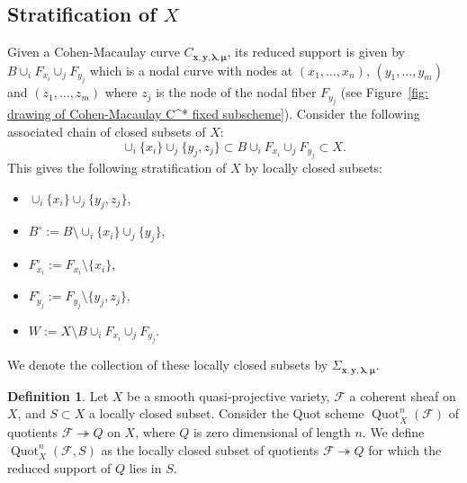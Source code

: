 \documentclass[12pt]{amsart}
\theoremstyle{definition}
\newtheorem{definition}[theorem]{Definition}
\newcommand{\Quot}{\operatorname{Quot}}
\newcommand{\F}{\mathcal{F}}
\newcommand{\boldx}{\boldsymbol{x}}
\newcommand{\boldy}{\boldsymbol{y}}
\newcommand{\boldlambda}{\boldsymbol{\lambda }}
\newcommand{\boldmu}{\boldsymbol{\mu }}
\begin{document}
\subsection{Stratification of $X$}

Given a Cohen-Macaulay  curve $C_{\boldx, \boldy, \boldlambda, \boldmu}$, 
its reduced support is given by $B\cup_{i}F_{x_{i}}\cup_{j}F_{y_{j}}$
which is a nodal curve with nodes at $(x_{1},\dotsc ,x_{n})$,
$(y_{1},\dotsc ,y_{m})$ and $(z_{1},\dotsc ,z_{m})$ where $z_{j}$ is
the node of the nodal fiber $F_{y_{j}}$ (see Figure~\ref{fig: drawing
of Cohen-Macaulay C^* fixed subscheme}).
Consider the following associated chain of closed subsets of $X$:
\[
\cup_i \{x_i\} \cup_j \{y_j,z_j\} \subset B\cup_{i}F_{x_{i}}\cup_{j}F_{y_{j}} \subset X.
\]
This gives the following stratification of $X$ by locally closed subsets:
\begin{itemize}
\item $\cup_i \{x_i\} \cup_j \{y_j,z_j\}$,
\item $B^\circ := B \setminus \cup_i \{x_i\} \cup_j \{y_j\}$,
\item $F_{x_i}^{\circ} := F_{x_i} \setminus \{x_i\}$,
\item $F_{y_j}^{\circ} := F_{y_j} \setminus \{y_j,z_j\}$,
\item $W:=X \setminus B\cup_{i}F_{x_{i}}\cup_{j}F_{y_{j}}$.
\end{itemize}
We denote the collection of these locally closed subsets by $\Sigma_{\boldx, \boldy, \boldlambda, \boldmu}$. 

\begin{definition} \label{QuotSupp}
Let $X$ be a smooth quasi-projective variety, $\F$ a coherent sheaf on $X$, and $S \subset X$ a locally closed subset. Consider the Quot scheme $\Quot_X^n(\F)$ of quotients $\F \twoheadrightarrow Q$ on $X$, where $Q$ is zero dimensional of length $n$. We define $\Quot_X^n(\F,S)$ as the locally closed subset of quotients $\F \twoheadrightarrow Q$ for which the reduced support of $Q$ lies in $S$.
\end{definition}
\end{document}
